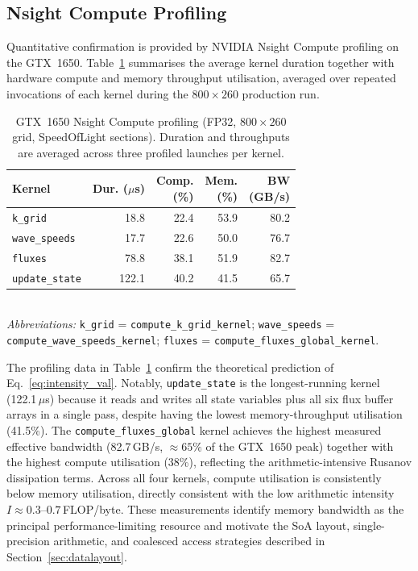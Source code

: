\documentclass[10pt, conference]{FMFP2023}
\begin{document}
\subsection{Nsight Compute Profiling}

Quantitative confirmation is provided by NVIDIA Nsight
Compute profiling on the GTX~1650.
Table~\ref{tab:nsight} summarises the average kernel
duration together with hardware compute and memory
throughput utilisation, averaged over repeated invocations
of each kernel during the $800\times260$ production run.

\begin{table}[htbp]
\caption{GTX~1650 Nsight Compute profiling (FP32,
$800\times260$ grid, SpeedOfLight sections).
Duration and throughputs are averaged across
three profiled launches per kernel.}
\label{tab:nsight}
\centering
\begin{tabular}{@{}p{3.0cm}rrrr@{}}
\toprule
\textbf{Kernel}
    & \shortstack[r]{\textbf{Dur.}\\($\mu$s)}
    & \shortstack[r]{\textbf{Comp.}\\(\%)}
    & \shortstack[r]{\textbf{Mem.}\\(\%)}
    & \shortstack[r]{\textbf{BW}\\(GB/s)} \\
\midrule
\texttt{k\_grid}      & 18.8 & 22.4 & 53.9 & 80.2 \\
\texttt{wave\_speeds} & 17.7 & 22.6 & 50.0 & 76.7 \\
\texttt{fluxes}       & 78.8 & 38.1 & 51.9 & 82.7 \\
\texttt{update\_state}& 122.1 & 40.2 & 41.5 & 65.7 \\
\bottomrule
\end{tabular}
\\[3pt]
{\footnotesize
\textit{Abbreviations:}
\texttt{k\_grid} = \texttt{compute\_k\_grid\_kernel};
\texttt{wave\_speeds} = \texttt{compute\_wave\_speeds\_kernel};
\texttt{fluxes} = \texttt{compute\_fluxes\_global\_kernel}.}
\end{table}

The profiling data in Table~\ref{tab:nsight} confirm the
theoretical prediction of Eq.~\eqref{eq:intensity_val}.
Notably, \texttt{update\_state} is the longest-running
kernel (122.1\,$\mu$s) because it reads and writes all
state variables plus all six flux buffer arrays in a single
pass, despite having the lowest memory-throughput
utilisation (41.5\%).
The \texttt{compute\_fluxes\_global} kernel achieves the
highest measured effective bandwidth (82.7\,GB/s,
$\approx65\%$ of the GTX~1650 peak) together with the
highest compute utilisation (38\%), reflecting the
arithmetic-intensive Rusanov dissipation terms.
Across all four kernels, compute utilisation is
consistently below memory utilisation, directly
consistent with the low arithmetic intensity
$I\approx0.3$--$0.7$\,FLOP/byte.
These measurements identify memory bandwidth as the
principal performance-limiting resource and motivate the
SoA layout, single-precision arithmetic, and coalesced
access strategies described in Section~\ref{sec:datalayout}.
\end{document}
